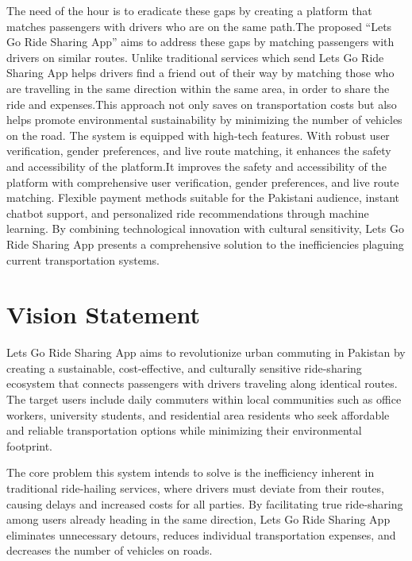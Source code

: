 The need of the hour is to eradicate these gaps by creating a platform that matches passengers with drivers who are on the same path.The proposed “Lets Go Ride Sharing App” aims to address these gaps by matching passengers with drivers on similar routes. Unlike traditional services which send Lets Go Ride Sharing App helps drivers find a friend out of their way by matching those who are travelling in the same direction within the same area, in order to share the ride and expenses.This approach not only saves on transportation costs but also helps promote environmental sustainability by minimizing the number of vehicles on the road. The system is equipped with high-tech features. With robust user verification, gender preferences, and live route matching, it enhances the safety and accessibility of the platform.It improves the safety and accessibility of the platform with comprehensive user verification, gender preferences, and live route matching. Flexible payment methods suitable for the Pakistani audience, instant chatbot support, and personalized ride recommendations through machine learning. By combining technological innovation with cultural sensitivity, Lets Go Ride Sharing App presents a comprehensive solution to the inefficiencies plaguing current transportation systems.


\section{Vision Statement}

Lets Go Ride Sharing App aims to revolutionize urban commuting in Pakistan by creating a sustainable, cost-effective, and culturally sensitive ride-sharing ecosystem that connects passengers with drivers traveling along identical routes. The target users include daily commuters within local communities such as office workers, university students, and residential area residents who seek affordable and reliable transportation options while minimizing their environmental footprint.

The core problem this system intends to solve is the inefficiency inherent in traditional ride-hailing services, where drivers must deviate from their routes, causing delays and increased costs for all parties. By facilitating true ride-sharing among users already heading in the same direction, Lets Go Ride Sharing App eliminates unnecessary detours, reduces individual transportation expenses, and decreases the number of vehicles on roads.

